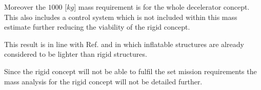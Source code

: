 Moreover the $1000$ [$kg$] mass requirement is for the whole decelerator concept. This also includes a control system which is not included within this mass estimate further reducing the viability of the rigid concept. 


This result is in line with Ref. \cite{Cianciolo2010} and \cite{Cassapakis1995} in which inflatable structures are already considered to be lighter than rigid structures.


Since the rigid concept will not be able to fulfil the set mission requirements the mass analysis for the rigid concept will not be detailed further. 

 


